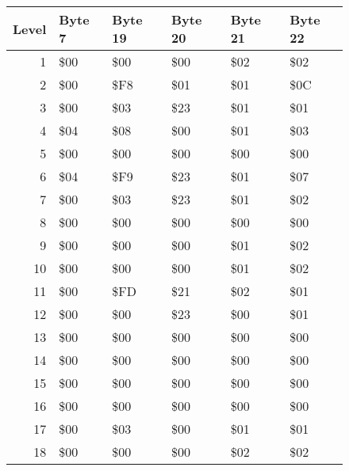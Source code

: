 \begin{figure}[H]
  {
    \setlength{\tabcolsep}{3.0pt}
    \setlength\cmidrulewidth{\heavyrulewidth} %
    \begin{adjustbox}{width=\textwidth}

      \begin{tabular}{rlllll}
        \toprule
        Level & Byte 7    & Byte 19   & Byte 20   & Byte 21   & Byte 22   \\
        \midrule
        1 & \$00       & \$00       & \$00       & \$02       & \$02       \\
        2 & \$00       & \$F8       & \$01       & \$01       & \$0C       \\
        3 & \$00       & \$03       & \$23       & \$01       & \$01       \\
        4 & \$04       & \$08       & \$00       & \$01       & \$03       \\
        5 & \$00       & \$00       & \$00       & \$00       & \$00       \\
        6 & \$04       & \$F9       & \$23       & \$01       & \$07       \\
        7 & \$00       & \$03       & \$23       & \$01       & \$02       \\
        8 & \$00       & \$00       & \$00       & \$00       & \$00       \\
        9 & \$00       & \$00       & \$00       & \$01       & \$02       \\
        10 & \$00       & \$00       & \$00       & \$01       & \$02       \\
        11 & \$00       & \$FD       & \$21       & \$02       & \$01       \\
        12 & \$00       & \$00       & \$23       & \$00       & \$01       \\
        13 & \$00       & \$00       & \$00       & \$00       & \$00       \\
        14 & \$00       & \$00       & \$00       & \$00       & \$00       \\
        15 & \$00       & \$00       & \$00       & \$00       & \$00       \\
        16 & \$00       & \$00       & \$00       & \$00       & \$00       \\
        17 & \$00       & \$03       & \$00       & \$01       & \$01       \\
        18 & \$00       & \$00       & \$00       & \$02       & \$02       \\

\end{tabular}
\end{adjustbox}}
\end{figure}
